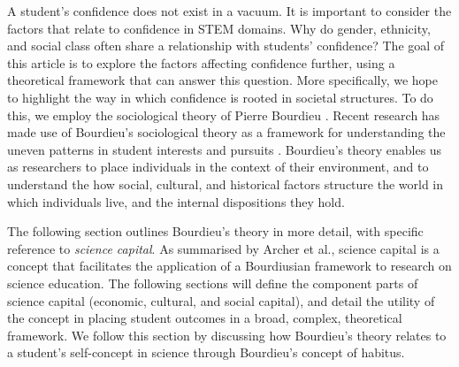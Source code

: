 \documentclass[smallextended]{svjour3}       %
\begin{document}
A student's confidence does not exist in a vacuum. It is important to consider the factors that relate to confidence in STEM domains. Why do gender, ethnicity, and social class often share a relationship with students' confidence? The goal of this article is to explore the factors affecting confidence further, using a theoretical framework that can answer this question. More specifically, we hope to highlight the way in which confidence is rooted in societal structures. To do this, we employ the sociological theory of Pierre Bourdieu \cite{Bourdieu1984}. Recent research has made use of Bourdieu's sociological theory as a framework for understanding the uneven patterns in student interests and pursuits \cite{archer2013aspires,Archer_2015,turnbull2019bourdieu}. Bourdieu's theory enables us as researchers to place individuals in the context of their environment, and to understand the how social, cultural, and historical factors structure the world in which individuals live, and the internal dispositions they hold. 

The following section outlines Bourdieu's theory in more detail, with specific reference to \textit{science capital}. As summarised by Archer et al., \citeyear{Archer_2015} science capital is a concept that facilitates the application of a Bourdiusian framework to research on science education. The following sections will define the component parts of science capital (economic, cultural, and social capital), and detail the utility of the concept in placing student outcomes in a broad, complex, theoretical framework. We follow this section by discussing how Bourdieu's theory relates to a student's self-concept in science through Bourdieu's concept of habitus.
\end{document}
